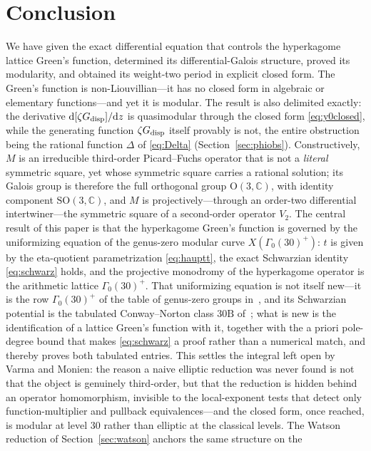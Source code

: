 \documentclass[11pt]{article}
\newcommand{\rmd}{\mathrm{d}}
\theoremstyle{plain}
\theoremstyle{remark}
\begin{document}
\section{Conclusion}
We have given the exact differential equation that controls the hyperkagome lattice Green's function,
determined its differential-Galois structure, proved its modularity, and obtained its weight-two period in
explicit closed form. The Green's function is non-Liouvillian---it has no closed form in algebraic or
elementary functions---and yet it is modular. The result is also delimited exactly: the derivative
$\rmd[\zeta G_{\rm disp}]/\rmd z$ is quasimodular through the closed form \eqref{eq:y0closed}, while the
generating function $\zeta G_{\rm disp}$ itself provably is not, the entire obstruction being the rational
function $\Delta$ of \eqref{eq:Delta} (Section~\ref{sec:phiobs}). Constructively, $M$ is an irreducible
third-order Picard--Fuchs operator that is not a \emph{literal} symmetric square, yet whose symmetric square
carries a rational solution; its Galois group is therefore the full orthogonal group
$\mathrm{O}(3,\mathbb{C})$, with identity component $\mathrm{SO}(3,\mathbb{C})$, and $M$ is
projectively---through an order-two differential intertwiner---the symmetric square of a second-order operator
$V_2$. The central result of this paper is that the hyperkagome Green's function is governed by the
uniformizing equation of the genus-zero modular curve $X(\Gamma_0(30)^+)$: $t$ is given by the
eta-quotient parametrization \eqref{eq:hauptt}, the exact Schwarzian identity \eqref{eq:schwarz}
holds, and the projective monodromy of the hyperkagome operator is the arithmetic lattice
$\Gamma_0(30)^+$. That uniformizing equation is not itself new---it is the row $\Gamma_0(30)^+$ of
the table of genus-zero groups in~\cite{LianYau1995}, and its Schwarzian potential is the tabulated
Conway--Norton class $30\mathrm{B}$ of~\cite{LianWiczer2006}; what is new is the identification of a
lattice Green's function with it, together with the a priori pole-degree bound that makes
\eqref{eq:schwarz} a proof rather than a numerical match, and thereby proves both tabulated
entries. This settles the integral left open by Varma and Monien: the reason a naive elliptic
reduction was never found is not that the object is genuinely third-order, but that the reduction is hidden
behind an operator homomorphism, invisible to the local-exponent tests that detect only function-multiplier
and pullback equivalences---and the closed form, once reached, is modular at level $30$ rather than elliptic
at the classical levels. The Watson reduction of Section~\ref{sec:watson} anchors the same structure on the
\end{document}
